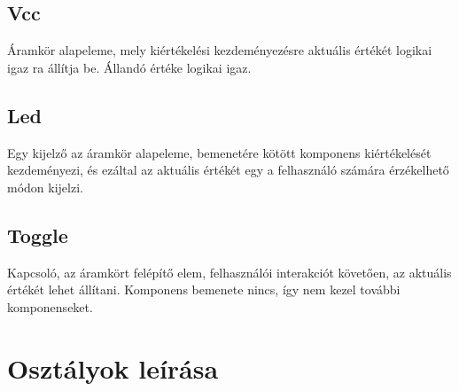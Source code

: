 \subsection{\bf Vcc}
Áramkör alapeleme, mely kiértékelési kezdeményezésre aktuális értékét logikai igaz ra állítja be. Állandó értéke logikai igaz.

\subsection{\bf Led}
Egy kijelző az áramkör alapeleme, bemenetére kötött komponens kiértékelését kezdeményezi, és ezáltal az aktuális értékét egy a felhasználó számára érzékelhető módon kijelzi.

\subsection{\bf Toggle}
Kapcsoló, az áramkört felépítő elem, felhasználói interakciót követően, az aktuális értékét lehet állítani. Komponens bemenete nincs, így nem kezel további komponenseket.

\section{Osztályok leírása}






